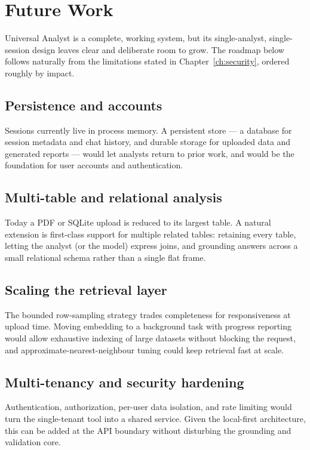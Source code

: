 \chapter{Future Work}
\label{ch:future}

Universal Analyst is a complete, working system, but its single-analyst,
single-session design leaves clear and deliberate room to grow. The roadmap
below follows naturally from the limitations stated in
Chapter~\ref{ch:security}, ordered roughly by impact.

\section{Persistence and accounts}
Sessions currently live in process memory. A persistent store --- a database for
session metadata and chat history, and durable storage for uploaded data and
generated reports --- would let analysts return to prior work, and would be the
foundation for user accounts and authentication.

\section{Multi-table and relational analysis}
Today a PDF or SQLite upload is reduced to its largest table. A natural extension
is first-class support for multiple related tables: retaining every table,
letting the analyst (or the model) express joins, and grounding answers across a
small relational schema rather than a single flat frame.

\section{Scaling the retrieval layer}
The bounded row-sampling strategy trades completeness for responsiveness at
upload time. Moving embedding to a background task with progress reporting would
allow exhaustive indexing of large datasets without blocking the request, and
approximate-nearest-neighbour tuning could keep retrieval fast at scale.

\section{Multi-tenancy and security hardening}
Authentication, authorization, per-user data isolation, and rate limiting would
turn the single-tenant tool into a shared service. Given the local-first
architecture, this can be added at the API boundary without disturbing the
grounding and validation core.

